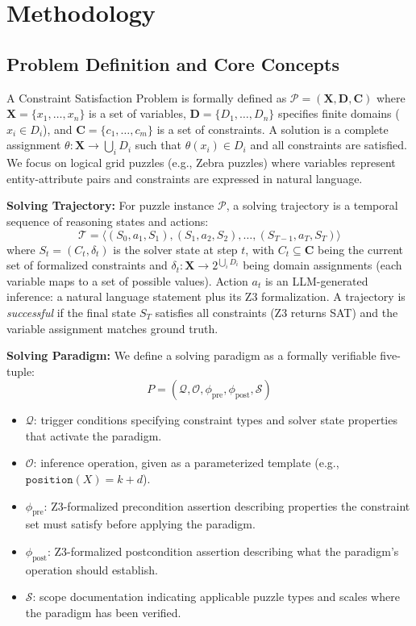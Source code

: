 
\section{Methodology}

\subsection{Problem Definition and Core Concepts}

A Constraint Satisfaction Problem is formally defined as $\mathcal{P} = (\mathbf{X}, \mathbf{D}, \mathbf{C})$ where $\mathbf{X} = \{x_1, \ldots, x_n\}$ is a set of variables, $\mathbf{D} = \{D_1, \ldots, D_n\}$ specifies finite domains ($x_i \in D_i$), and $\mathbf{C} = \{c_1, \ldots, c_m\}$ is a set of constraints. A solution is a complete assignment $\theta: \mathbf{X} \to \bigcup_i D_i$ such that $\theta(x_i) \in D_i$ and all constraints are satisfied. We focus on logical grid puzzles (e.g., Zebra puzzles) where variables represent entity-attribute pairs and constraints are expressed in natural language.

\textbf{Solving Trajectory:} For puzzle instance $\mathcal{P}$, a solving trajectory is a temporal sequence of reasoning states and actions:
\[
\mathcal{T} = \langle (S_0, a_1, S_1), (S_1, a_2, S_2), \ldots, (S_{T-1}, a_T, S_T) \rangle
\]
where $S_t = (C_t, \delta_t)$ is the solver state at step $t$, with $C_t \subseteq \mathbf{C}$ being the current set of formalized constraints and $\delta_t: \mathbf{X} \to 2^{\bigcup_i D_i}$ being domain assignments (each variable maps to a set of possible values). Action $a_t$ is an LLM-generated inference: a natural language statement plus its Z3 formalization. A trajectory is \textit{successful} if the final state $S_T$ satisfies all constraints (Z3 returns SAT) and the variable assignment matches ground truth.

\textbf{Solving Paradigm:} We define a solving paradigm as a formally verifiable five-tuple:
\[
P = (\mathcal{Q}, \mathcal{O}, \phi_{\text{pre}}, \phi_{\text{post}}, \mathcal{S})
\]
\begin{itemize}
    \item $\mathcal{Q}$: trigger conditions specifying constraint types and solver state properties that activate the paradigm.
    \item $\mathcal{O}$: inference operation, given as a parameterized template (e.g., $\texttt{position}(X) = k + d$).
    \item $\phi_{\text{pre}}$: Z3-formalized precondition assertion describing properties the constraint set must satisfy before applying the paradigm.
    \item $\phi_{\text{post}}$: Z3-formalized postcondition assertion describing what the paradigm's operation should establish.
    \item $\mathcal{S}$: scope documentation indicating applicable puzzle types and scales where the paradigm has been verified.
\end{itemize}

